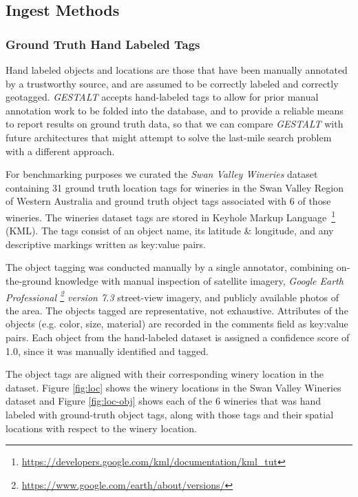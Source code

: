 \subsection{Ingest Methods}
\subsubsection{Ground Truth Hand Labeled Tags} 
Hand labeled objects and locations are those that have been manually annotated by a trustworthy source, and are assumed to be correctly labeled and correctly geotagged. 
\emph{GESTALT} accepts hand-labeled tags to allow for prior manual annotation work to be folded into the database, and to provide a reliable means to report results on ground truth data, so that we can compare \emph{GESTALT} with future architectures that might attempt to solve the last-mile search problem with a different approach. 

For benchmarking purposes we curated the \emph{Swan Valley Wineries} dataset containing 31 ground truth location tags for wineries in the Swan Valley Region of Western Australia and  ground truth object tags associated with 6 of those wineries. 
The wineries dataset tags are stored in Keyhole Markup Language~\footnote{\href{https://developers.google.com/kml/documentation/kml\_tut}{https://developers.google.com/kml/documentation/kml\_tut}} (KML).
The tags consist of an object name, its latitude \& longitude, and any descriptive markings written as key:value pairs. 

The object tagging was conducted manually by a single annotator, combining on-the-ground knowledge with manual inspection of satellite imagery, \textit{Google Earth Professional \footnote{\href{https://www.google.com/earth/about/versions/}{https://www.google.com/earth/about/versions/}} version 7.3} street-view imagery, and publicly available photos of the area. 
The objects tagged are representative, not exhaustive. 
Attributes of the objects (e.g. color, size, material) are recorded in the comments field as key:value pairs.
Each object from the hand-labeled dataset is assigned a confidence score of 1.0, since it was manually identified and tagged.

The object tags are aligned with their corresponding winery location in the dataset.
Figure \ref{fig:loc} shows the winery locations in the Swan Valley Wineries dataset and Figure \ref{fig:loc-obj} shows each of the 6 wineries that was hand labeled with ground-truth object tags, along with those tags and their spatial locations with respect to the winery location.


